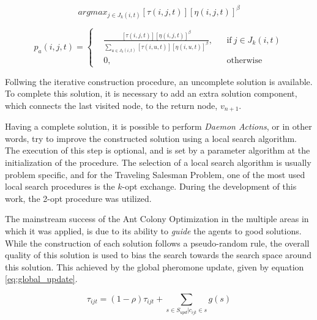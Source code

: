 \begin{equation}
  \label{eq:exploitation}
    arg max_{j \in J_k(i,t)} {[\tau(i,j,t)][\eta(i,j,t)]^\beta}
\end{equation}


\begin{equation}
\label{eq:exploration}
  p_a(i,j,t) =  \left \{
    \begin{aligned}
      & \frac{[\tau(i,j,t)][\eta(i,j,t)]^\beta}{\sum_{u \in J_k(i,t)}[\tau(i,u,t)][\eta(i,u,t)]^\beta}, && \text{if}\ j \in J_k(i,t) \\
      &0, && \text{otherwise}
    \end{aligned} \right. 
\end{equation}

Follwing the iterative construction procedure, an uncomplete solution is
available. To complete this solution, it is necessary to add an extra solution
component, which connects the last visited node, to the return node, $v_{n+1}$.

Having a complete solution, it is possible to perform \textit{Daemon Actions},
or in other words, try to improve the constructed solution using a local search
algorithm. The execution of this step is optional, and is set by a parameter
algorithm at the initialization of the procedure. The selection of a local
search algorithm is usually problem specific, and for the Traveling Salesman
Problem, one of the most used local search procedures is the $k$-opt exchange.
During the development of this work, the 2-opt procedure was utilized.

The mainstream success of the Ant Colony Optimization in the multiple areas in
which it was applied, is due to its ability to \textit{guide} the agents to good
solutions. While the construction of each solution follows a pseudo-random rule,
the overall quality of this solution is used to bias the search towards the
search space around this solution. This achieved by the global pheromone update,
given by equation \ref{eq:global_update}.


\begin{equation}
\label{eq:global_update}
  \tau_{ijt} = (1-\rho)\tau_{ijt} + \sum_{s \in S_{upd} | c_{ijt} \in s} g(s)
\end{equation}

